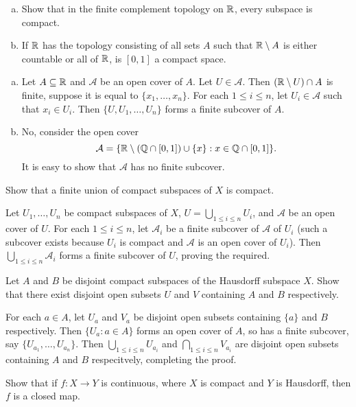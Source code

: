 	\begin{exercise}
	\phantom{bah}
		\begin{enumerate}[(a)]
			\item Show that in the finite complement topology on $\mathbb{R}$, every subspace is compact. 
			\item If $\mathbb{R}$ has the topology consisting of all sets $A$ such that $\mathbb{R}\setminus A$ is either countable or all of $\mathbb{R}$, is $[0,1]$ a compact space.
		\end{enumerate}
	\end{exercise}
	\begin{solution*}
		\begin{enumerate}[(a)]
			\item Let $A\subseteq\mathbb{R}$ and $\mathcal{A}$ be an open cover of $A$. Let $U\in\mathcal{A}$. Then $(\mathbb{R}\setminus U)\cap A$ is finite, suppose it is equal to $\{x_1,\ldots,x_n\}$. For each $1\leq i\leq n$, let $U_i\in\mathcal{A}$ such that $x_i\in U_i$. Then $\{U,U_1,\ldots,U_n\}$ forms a finite subcover of $A$.
			\item No, consider the open cover
			\[ \mathcal{A} = \{ \mathbb{R}\setminus (\mathbb{Q}\cap[0,1]) \cup\{x\} : x\in \mathbb{Q}\cap[0,1] \}. \]
			It is easy to show that $\mathcal{A}$ has no finite subcover.
		\end{enumerate}
	\end{solution*}

	\begin{exercise}
		Show that a finite union of compact subspaces of $X$ is compact.
	\end{exercise}
	\begin{solution*}
		Let $U_1,\ldots,U_n$ be compact subspaces of $X$, $U = \bigcup_{1\leq i\leq n} U_i$, and $\mathcal{A}$ be an open cover of $U$. For each $1\leq i\leq n$, let $\mathcal{A}_i$ be a finite subcover of $\mathcal{A}$ of $U_i$ (such a subcover exists because $U_i$ is compact and $\mathcal{A}$ is an open cover of $U_i$). Then $\bigcup_{1\leq i\leq n}\mathcal{A}_i$ forms a finite subcover of $U$, proving the required.
	\end{solution*}

	\setcounter{exercise}{4}
	\begin{exercise}
		Let $A$ and $B$ be disjoint compact subspaces of the Hausdorff subspace $X$. Show that there exist disjoint open subsets $U$ and $V$ containing $A$ and $B$ respectively.
	\end{exercise}
	\begin{solution*}
		For each $a\in A$, let $U_a$ and $V_a$ be disjoint open subsets containing $\{a\}$ and $B$ respectively. Then $\{U_a : a\in A\}$ forms an open cover of $A$, so has a finite subcover, say $\{U_{a_1},\ldots,U_{a_n}\}$. Then $\bigcup_{1\leq i\leq n} U_{a_i}$ and $\bigcap_{1\leq i\leq n} V_{a_i}$ are disjoint open subsets containing $A$ and $B$ respecitvely, completing the proof.
	\end{solution*}
	
	\begin{exercise}
		Show that if $f:X\to Y$ is continuous, where $X$ is compact and $Y$ is Hausdorff, then $f$ is a closed map.
	\end{exercise}
	\begin{solution*}
		
	\end{solution*}